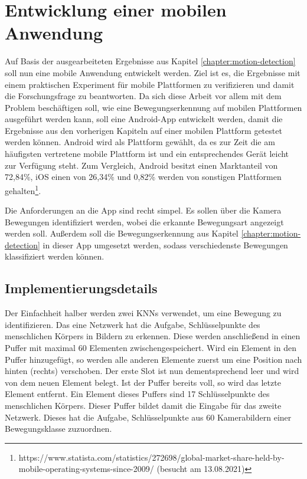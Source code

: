 \chapter{Entwicklung einer mobilen Anwendung}\label{mobile-app}
Auf Basis der ausgearbeiteten Ergebnisse aus Kapitel
\ref{chapter:motion-detection} soll nun eine mobile Anwendung entwickelt
werden. Ziel ist es, die Ergebnisse mit einem praktischen Experiment für mobile
Plattformen zu verifizieren und damit die Forschungsfrage zu beantworten. Da
sich diese Arbeit vor allem mit dem Problem beschäftigen soll, wie eine
Bewegungserkennung auf mobilen Plattformen ausgeführt werden kann, soll eine
Android-App entwickelt werden, damit die Ergebnisse aus den vorherigen Kapiteln auf
einer mobilen Plattform getestet werden können. Android wird als Plattform
gewählt, da es zur Zeit die am häufigsten vertretene mobile Plattform ist und
ein entsprechendes Gerät leicht zur Verfügung steht. Zum Vergleich, Android
besitzt einen Marktanteil von 72,84\%, iOS einen von 26,34\% und 0,82\% werden
von sonstigen Plattformen
gehalten\footnote{https://www.statista.com/statistics/272698/global-market-share-held-by-mobile-operating-systems-since-2009/
  (besucht am 13.08.2021)}.

Die Anforderungen an die App sind recht simpel. Es sollen über die Kamera
Bewegungen identifiziert werden, wobei die erkannte Bewegungsart angezeigt
werden soll. Außerdem soll die Bewegungserkennung aus Kapitel \ref{chapter:motion-detection} in dieser App umgesetzt werden, sodass verschiedenste Bewegungen klassifiziert werden können.

\section{Implementierungsdetails}
Der Einfachheit halber werden zwei KNNs verwendet, um eine Bewegung zu
identifizieren. Das eine Netzwerk hat die Aufgabe, Schlüsselpunkte des
menschlichen Körpers in Bildern zu erkennen. Diese werden anschließend in einen
Puffer mit maximal 60 Elementen zwischengespeichert. Wird ein Element in den
Puffer hinzugefügt, so werden alle anderen Elemente zuerst um eine Position nach
hinten (rechts) verschoben. Der erste Slot ist nun dementsprechend leer und wird
von dem neuen Element belegt. Ist der Puffer bereits voll, so wird das letzte
Element entfernt. Ein Element dieses Puffers sind 17 Schlüsselpunkte des
menschlichen Körpers. Dieser Puffer bildet damit die Eingabe für das zweite
Netzwerk.  Dieses hat die Aufgabe, Schlüsselpunkte aus 60 Kamerabildern einer
Bewegungsklasse zuzuordnen.

